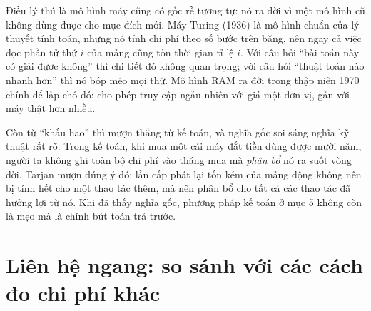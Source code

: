 \documentclass[../../algorithm.tex]{subfiles}
\begin{document}
Điều lý thú là mô hình máy cũng có gốc rễ tương tự: nó ra đời vì một mô hình cũ không dùng được cho mục đích mới. Máy Turing (1936) là mô hình chuẩn của lý thuyết tính toán, nhưng nó tính chi phí theo số bước trên băng, nên ngay cả việc đọc phần tử thứ \(i\) của mảng cũng tốn thời gian tỉ lệ \(i\). Với câu hỏi ``bài toán này có giải được không'' thì chi tiết đó không quan trọng; với câu hỏi ``thuật toán nào nhanh hơn'' thì nó bóp méo mọi thứ. Mô hình RAM ra đời trong thập niên 1970 chính để lấp chỗ đó: cho phép truy cập ngẫu nhiên với giá một đơn vị, gần với máy thật hơn nhiều.

Còn từ ``khấu hao'' thì mượn thẳng từ kế toán, và nghĩa gốc soi sáng nghĩa kỹ thuật rất rõ. Trong kế toán, khi mua một cái máy đắt tiền dùng được mười năm, người ta không ghi toàn bộ chi phí vào tháng mua mà \emph{phân bổ} nó ra suốt vòng đời. Tarjan mượn đúng ý đó: lần cấp phát lại tốn kém của mảng động không nên bị tính hết cho một thao tác thêm, mà nên phân bổ cho tất cả các thao tác đã hưởng lợi từ nó\cite{tarjan1985amortized}. Khi đã thấy nghĩa gốc, phương pháp kế toán ở mục 5 không còn là mẹo mà là chính bút toán trả trước.

\begin{gocre}
\end{gocre}

\section{Liên hệ ngang: so sánh với các cách đo chi phí khác}
\end{document}
